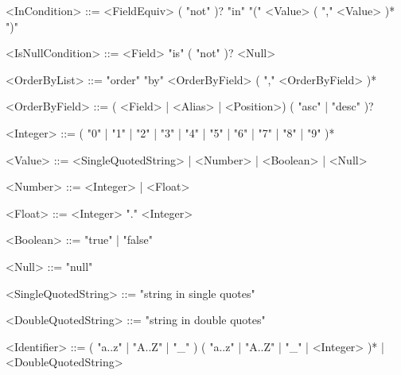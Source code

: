 \begin{grammar}
<InCondition> ::= <FieldEquiv> ( "not" )? "in" "(" <Value> ( "," <Value> )* ")"

<IsNullCondition> ::= <Field> "is" ( "not" )? <Null>

<OrderByList> ::= "order" "by" <OrderByField> ( "," <OrderByField> )*

<OrderByField> ::= ( <Field> | <Alias> | <Position>) ( "asc" | "desc" )?

<Integer> ::= ( "0" | "1" | "2" | "3" | "4" | "5" | "6" | "7" | "8" | "9" )*

<Value> ::= <SingleQuotedString> | <Number> | <Boolean> | <Null>

<Number> ::= <Integer> | <Float>

<Float> ::= <Integer> "." <Integer>

<Boolean> ::= "true" | "false"

<Null> ::= "null"

<SingleQuotedString> ::= "string in single quotes"

<DoubleQuotedString> ::= "string in double quotes"

<Identifier> ::= ( "a..z" | "A..Z" | "_" ) ( "a..z" | "A..Z" | "_" | <Integer> )* | <DoubleQuotedString>
\end{grammar}